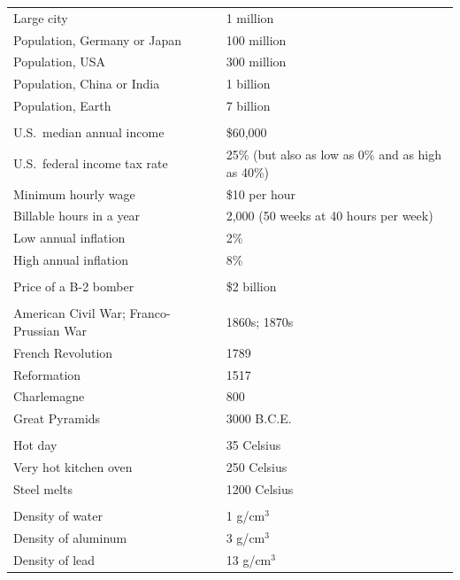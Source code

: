 \begin{table}[t!]
{\begin{tabular}{lp{}}
Large city                            & 1 million \\
Population, Germany or Japan          & 100 million \\
Population, USA                       & 300 million \\
Population, China or India            & 1 billion \\
Population, Earth                     & 7 billion \\
                                      & \\[-6pt]
U.S.\ median annual income            & \$60,000 \\
U.S.\ federal income tax rate         & 25\% (but also as low as 0\%
                                              and as high as 40\%) \\
Minimum hourly wage                   & \$10 per hour \\
Billable hours in a year              & 2,000 
                                        (50 weeks at 40 hours per week) \\
Low annual inflation                  & 2\% \\
High annual inflation                 & 8\% \\
                                      & \\ [-6pt]
Price of a B-2 bomber                  & \$2 billion \\
                                      & \\[-6pt]
American Civil War; Franco-Prussian War & 1860s; 1870s \\
French Revolution			& 1789 \\
Reformation				& 1517 \\
Charlemagne				&  800 \\
Great Pyramids			        & 3000 B.C.E. \\
                                        & \\[-6pt]
Hot day                                 & 35 Celsius \\
Very hot kitchen oven		        & 250 Celsius \\
Steel melts				& 1200 Celsius \\
                                        & \\[-6pt]
Density of water                        & 1 {g}/{cm}$^3$ \\
Density of aluminum                     & 3 g/{cm}$^3$ \\
Density of lead                         & 13 {g}/{cm}$^3$ \\

\end{tabular}}
\end{table}
